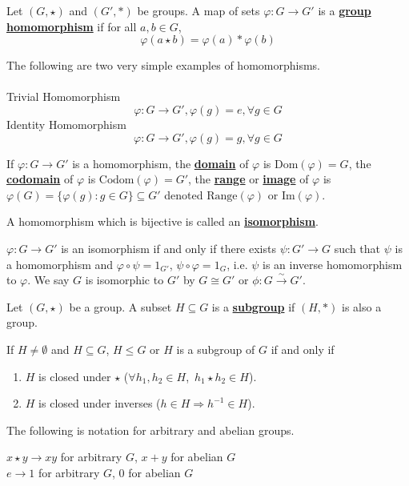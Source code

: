 \documentclass[11pt,letterpaper]{book}
\newcommand{\define}[1]{\underline{\textbf{#1}}}
\newcommand{\hmap}[3][\varphi]{%
    #1:#2\rightarrow#3}
\theoremstyle{definition}
\begin{document}
\begin{bdefi}
    Let $(G,\star)$ and $(G',\ast)$ be groups. A map of sets $\hmap{G}{G'}$ is a \define{group homomorphism} if for all $a,b\in G$,
    $$\varphi(a\star b)=\varphi(a)\ast\varphi(b)$$
\end{bdefi}

\begin{ex}
    The following are two very simple examples of homomorphisms.\\\\
    Trivial Homomorphism
    $$\hmap{G}{G'},\varphi(g)=e,\forall g\in G$$
    Identity Homomorphism
    $$\hmap{G}{G'},\varphi(g)=g,\forall g\in G$$
\end{ex}

\begin{defi}
    If $\hmap{G}{G'}$ is a homomorphism, the \define{domain} of $\varphi$ is $\text{Dom}(\varphi)=G$, the \define{codomain} of $\varphi$ is $\text{Codom}(\varphi)=G'$, the \define{range} or \define{image} of $\varphi$ is $\varphi(G)=\{\varphi(g):g\in G\}\subseteq G'$ denoted $\text{Range}(\varphi)$ or $\text{Im}(\varphi)$.
\end{defi}

\begin{bdefi}
    A homomorphism which is bijective is called an \define{isomorphism}.
\end{bdefi}

$\hmap{G}{G'}$ is an isomorphism if and only if there exists $\hmap[\psi]{G'}{G}$ such that $\psi$ is a homomorphism and $\varphi\circ\psi=1_{G'}$, $\psi\circ\varphi=1_{G}$, i.e. $\psi$ is an inverse homomorphism to $\varphi$. We say $G$ is isomorphic to $G'$ by $G\cong G'$ or $\phi:G\xrightarrow{\sim}G'$.

\begin{bdefi}
    Let $(G,\star)$ be a group. A subset $H\subseteq G$ is a \define{subgroup} if $(H,\ast)$ is also a group.
\end{bdefi}

If $H\ne\emptyset$ and $H\subseteq G$, $H\le G$ or $H$ is a subgroup of $G$ if and only if
\begin{enumerate}
    \item $H$ is closed under $\star$ ($\forall h_1,h_2\in H$,\ $h_1\star h_2\in H$).
    \item $H$ is closed under inverses ($h\in H\Rightarrow h^{-1}\in H$).
\end{enumerate}

\begin{note}
    The following is notation for arbitrary and abelian groups.
    \begin{center}
        $x\star y\rightarrow xy$ for arbitrary $G$, $x+y$ for abelian $G$\\
        $e\rightarrow1$ for arbitrary $G$, 0 for abelian $G$
    \end{center}
\end{note}
\end{document}
